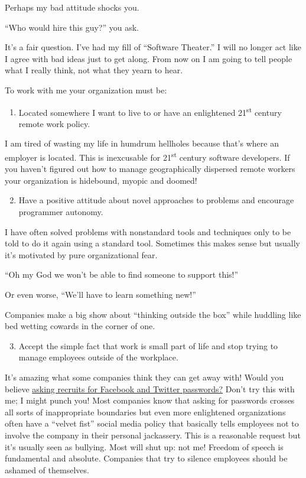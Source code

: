 Perhaps my bad attitude shocks you.

``Who would hire this guy?'' you ask.

It's a fair question. I've had my fill of ``Software Theater.'' I will
no longer act like I agree with bad ideas just to get along. From now on
I am going to tell people what I really think, not what they yearn to
hear.

To work with me your organization must be:

\begin{enumerate}
\itemsep1pt\parskip0pt
\item
  Located somewhere I want to live to or have an enlightened
  21\textsuperscript{st} century remote work policy.
\end{enumerate}

I am tired of wasting my life in humdrum hellholes because that's where
an employer is located. This is inexcusable for 21\textsuperscript{st}
century software developers. If you haven't figured out how to manage
geographically dispersed remote workers your organization is hidebound,
myopic and doomed!

\begin{enumerate}
\setcounter{enumi}{1}
\itemsep1pt\parskip0pt
\item
  Have a positive attitude about novel approaches to problems and
  encourage programmer autonomy.
\end{enumerate}

I have often solved problems with nonstandard tools and techniques only
to be told to do it again using a standard tool. Sometimes this makes
sense but usually it's motivated by pure organizational fear.

``Oh my God we won't be able to find someone to support this!''

Or even worse, ``We'll have to learn something new!''

Companies make a big show about ``thinking outside the box'' while
huddling like bed wetting cowards in the corner of one.

\begin{enumerate}
\setcounter{enumi}{2}
\itemsep1pt\parskip0pt
\item
  Accept the simple fact that work is small part of life and stop trying
  to manage employees outside of the workplace.
\end{enumerate}

It's amazing what some companies think they can get away with! Would you
believe
\href{http://mashable.com/2012/04/08/employer-facebook-password}{asking
recruits for Facebook and Twitter passwords?} Don't try this with me; I
might punch you! Most companies know that asking for passwords crosses
all sorts of inappropriate boundaries but even more enlightened
organizations often have a ``velvet fist'' social media policy that
basically tells employees not to involve the company in their personal
jackassery. This is a reasonable request but it's usually seen as
bullying. Most will shut up: not me! Freedom of speech is fundamental
and absolute. Companies that try to silence employees should be ashamed
of themselves.

